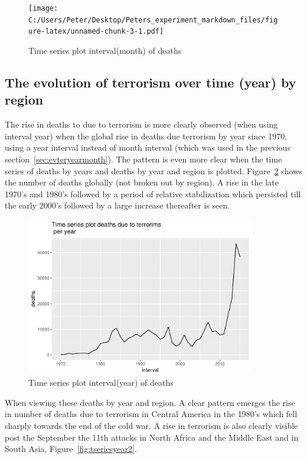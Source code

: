 \begin{figure}[t]
\texttt{[image: C:/Users/Peter/Desktop/Peters\_experiment\_markdown\_files/figure-latex/unnamed-chunk-3-1.pdf]}
\caption{Time series plot interval(month) of deaths}
\label{fig:tseriesmonth1}
\centering
\end{figure}

\subsection{The evolution of terrorism over time (year) by
region}

The rise in deaths to due to terrorism is more clearly observed (when using interval year) when the global rise in deaths due terrorism by year since 1970, using a year interval instead of month interval (which was used in the previous section~\ref{sec:evteryearmonth}). The pattern is even more clear when the time series of deaths by years and deaths by year and region is plotted. Figure~\ref{fig:tseriesyear1} shows the number of deaths globally (not broken out by region). A rise in the late 1970's and 1980's followed by a period of relative stabilization  which persisted till the early 2000's followed by a large increase thereafter is seen.

\begin{figure}[t]
\includegraphics[width=10cm]{Peters_experiment_markdown_files/figure-latex/unnamed-chunk-4-1.pdf}
\caption{Time series plot interval(year) of deaths}
\label{fig:tseriesyear1}
\centering
\end{figure}

When viewing these deaths by  year and region. A clear pattern emerges the rise in number of deaths due to terrorism in Central America in the 1980's which fell
sharply towards the end of the cold war. A rise in terrorism is also clearly visible post the September the 11th attacks in North Africa and the Middle East and in South Asia, Figure~\ref{fig:tseriesyear2}.

